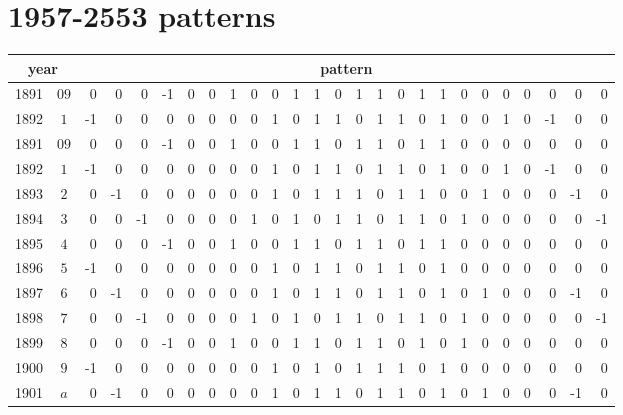 \documentclass[12 pt]{article}%
\begin{document}
\section{1957-2553 patterns}
\renewcommand{\arraystretch}{1.5}
\begin{tiny}
  \begin{centering}
    \begin{longtable}{|c|c||rrrrrrrrrrrrrrrrrrrrrrrr|}
      \hline
      \multicolumn{2}{|c||}{year} & \multicolumn{24}{c|}{pattern}\\
      \hline
      1891 & $09$ & 0 & 0 & 0 & -1 & 0 & 0 & 1 & 0 & 0 & 1 & 1 & 0 & 1 & 1 & 0 & 1 & 1 & 0 & 0 & 0 & 0 & 0 & 0 & 0 \\
      \hline
      1892 & $1$ & -1 & 0 & 0 & 0 & 0 & 0 & 0 & 0 & 1 & 0 & 1 & 1 & 0 & 1 & 1 & 0 & 1 & 0 & 0 & 1 & 0 & -1 & 0 & 0 \\
\hline
1891 & $09$ & 0 & 0 & 0 & -1 & 0 & 0 & 1 & 0 & 0 & 1 & 1 & 0 & 1 & 1 & 0 & 1 & 1 & 0 & 0 & 0 & 0 & 0 & 0 & 0 \\
\hline
1892 & $1$ & -1 & 0 & 0 & 0 & 0 & 0 & 0 & 0 & 1 & 0 & 1 & 1 & 0 & 1 & 1 & 0 & 1 & 0 & 0 & 1 & 0 & -1 & 0 & 0 \\
\hline
1893 & $2$ & 0 & -1 & 0 & 0 & 0 & 0 & 0 & 0 & 1 & 0 & 1 & 1 & 1 & 0 & 1 & 1 & 0 & 0 & 1 & 0 & 0 & 0 & -1 & 0 \\
\hline
1894 & $3$ & 0 & 0 & -1 & 0 & 0 & 0 & 0 & 1 & 0 & 1 & 0 & 1 & 1 & 0 & 1 & 1 & 0 & 1 & 0 & 0 & 0 & 0 & 0 & -1 \\
\hline
1895 & $4$ & 0 & 0 & 0 & -1 & 0 & 0 & 1 & 0 & 0 & 1 & 1 & 0 & 1 & 1 & 0 & 1 & 1 & 0 & 0 & 0 & 0 & 0 & 0 & 0 \\
\hline
1896 & $5$ & -1 & 0 & 0 & 0 & 0 & 0 & 0 & 0 & 1 & 0 & 1 & 1 & 0 & 1 & 1 & 0 & 1 & 0 & 0 & 0 & 0 & 0 & 0 & 0 \\
\hline
1897 & $6$ & 0 & -1 & 0 & 0 & 0 & 0 & 0 & 0 & 1 & 0 & 1 & 1 & 0 & 1 & 1 & 0 & 1 & 0 & 1 & 0 & 0 & 0 & -1 & 0 \\
\hline
1898 & $7$ & 0 & 0 & -1 & 0 & 0 & 0 & 0 & 1 & 0 & 1 & 0 & 1 & 1 & 0 & 1 & 1 & 0 & 1 & 0 & 0 & 0 & 0 & 0 & -1 \\
\hline
1899 & $8$ & 0 & 0 & 0 & -1 & 0 & 0 & 1 & 0 & 0 & 1 & 1 & 0 & 1 & 1 & 0 & 1 & 0 & 1 & 0 & 0 & 0 & 0 & 0 & 0 \\
\hline
1900 & $9$ & -1 & 0 & 0 & 0 & 0 & 0 & 0 & 0 & 1 & 0 & 1 & 0 & 1 & 1 & 1 & 0 & 1 & 0 & 0 & 0 & 0 & 0 & 0 & 0 \\
\hline
1901 & $a$ & 0 & -1 & 0 & 0 & 0 & 0 & 0 & 0 & 1 & 0 & 1 & 1 & 0 & 1 & 1 & 0 & 1 & 0 & 1 & 0 & 0 & 0 & -1 & 0 \\

\end{longtable}
\end{centering}
\end{tiny}
\end{document}
